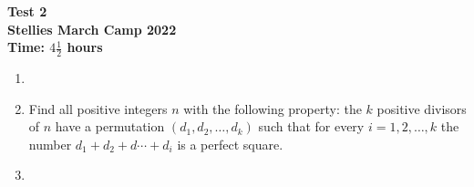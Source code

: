 \documentclass{article}
\begin{document}
\thispagestyle{empty}

\begin{center}
  \textbf{\Large Test 2}
  \\ \vspace{1em}
  \textbf{\large Stellies March Camp 2022}
  \\ \vspace{1em}
  \textbf{\large Time: $4\frac{1}{2}$ hours}
\end{center}

\vspace{24pt}

\begin{enumerate}

\item %


\item %
Find all positive integers $n$ with the following property:
the $k$ positive divisors of $n$ have a permutation $(d_1, d_2, \dotsc, d_k)$ such that for every $i = 1, 2, \dotsc, k$ the number $d_1 +d_2 +d\dotsb +d_i$ is a perfect square.

\item %


\end{enumerate}

\vfill
\centering
\begin{BVerbatim}
\end{BVerbatim}
\end{document}
